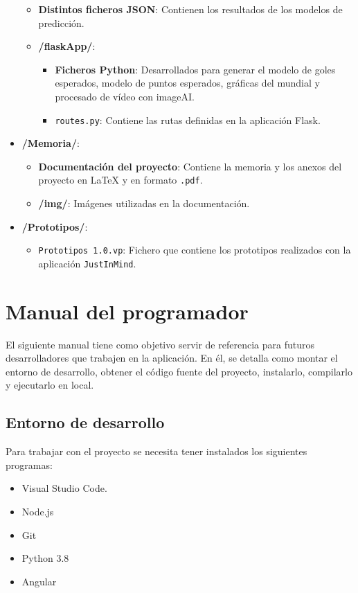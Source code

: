 \begin{itemize}
\begin{itemize}
        \item \textbf{Distintos ficheros JSON}: Contienen los resultados de los modelos de predicción.
        \item \textbf{/flaskApp/}:
        \begin{itemize}
            \item \textbf{Ficheros Python}: Desarrollados para generar el modelo de goles esperados, modelo de puntos esperados, gráficas del mundial y procesado de vídeo con imageAI.
            \item \texttt{routes.py}: Contiene las rutas definidas en la aplicación Flask.
        \end{itemize}
    \end{itemize}
    \item \textbf{/Memoria/}:
    \begin{itemize}
        \item \textbf{Documentación del proyecto}: Contiene la memoria y los anexos del proyecto en LaTeX y en formato \texttt{.pdf}.
        \item \textbf{/img/}: Imágenes utilizadas en la documentación.
    \end{itemize}
    \item \textbf{/Prototipos/}:
    \begin{itemize}
        \item \texttt{Prototipos 1.0.vp}: Fichero que contiene los prototipos realizados con la aplicación \texttt{JustInMind}.
    \end{itemize}
\end{itemize}

\section{Manual del programador}
El siguiente manual tiene como objetivo servir de referencia para futuros desarrolladores que trabajen en la aplicación. En él, se detalla como montar el entorno de desarrollo, obtener el código fuente del proyecto, instalarlo, compilarlo y ejecutarlo en local.
\subsection{Entorno de desarrollo}
Para trabajar con el proyecto se necesita tener instalados los siguientes programas:
\begin{itemize}
    \item Visual Studio Code.
    \item Node.js
    \item Git
    \item Python 3.8
    \item Angular
\end{itemize}


